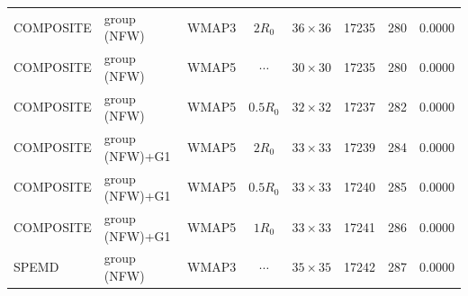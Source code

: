 \documentclass[useAMS,usenatbib]{mnras}
\def\nomicro{$\cdots$}
\begin{document}
\begin{table}
\begin{tabular}{llccccrr}
        COMPOSITE & group (NFW)       &WMAP3 & $2R_{0}$&$36\times36$ & 17235 & 280 & 0.0000\\
        COMPOSITE & group (NFW)       &WMAP5 & \nomicro&$30\times30$ & 17235 & 280 & 0.0000\\
        COMPOSITE & group (NFW)       &WMAP5 & $0.5R_{0}$&$32\times32$ & 17237 & 282 & 0.0000\\
        COMPOSITE & group (NFW)+G1    &WMAP5 & $2R_{0}$&$33\times33$ & 17239 & 284 & 0.0000\\
        COMPOSITE & group (NFW)+G1    &WMAP5 & $0.5R_{0}$&$33\times33$ & 17240 & 285 & 0.0000\\
        COMPOSITE & group (NFW)+G1    &WMAP5 & $1R_{0}$&$33\times33$ & 17241 & 286 & 0.0000\\
        SPEMD     & group (NFW)       &WMAP3 & \nomicro&$35\times35$ & 17242 & 287 & 0.0000\\
        \hline
    \end{tabular}
\end{table}
\end{document}
